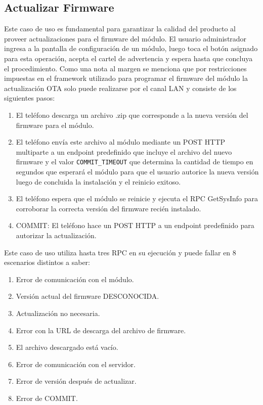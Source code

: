 \subsection{Actualizar Firmware}
Este caso de uso es fundamental para garantizar la calidad del producto al proveer actualizaciones para el firmware del módulo.
El usuario administrador ingresa a la pantalla de configuración de un módulo, luego toca el botón asignado para esta operación, acepta el cartel de advertencia y espera hasta que concluya el procedimiento.
Como una nota al margen se menciona que por restricciones impuestas en el framework utilizado para programar el firmware del módulo la actualización OTA solo puede realizarse por el canal LAN y consiste de los siguientes pasos:
\begin{enumerate}
	\item El teléfono descarga un archivo .zip que corresponde a la nueva versión del firmware para el módulo.
	\item El teléfono envía este archivo al módulo mediante un POST HTTP multiparte a un endpoint predefinido que incluye el archivo del nuevo firmware y el valor \texttt{COMMIT\_TIMEOUT} que determina la cantidad de tiempo en segundos que esperará el módulo para que el usuario autorice la nueva versión luego de concluida la instalación y el reinicio exitoso.
	\item El teléfono espera que el módulo se reinicie y ejecuta el RPC GetSysInfo para corroborar la correcta versión del firmware recién instalado.
	\item COMMIT: El teléfono hace un POST HTTP a un endpoint predefinido para autorizar la actualización.
\end{enumerate} 

Este caso de uso utiliza hasta tres RPC en su ejecución y puede fallar en 8 escenarios distintos a saber:

\begin{enumerate}
	\item Error de comunicación con el módulo.
	\item Versión actual del firmware DESCONOCIDA.
	\item Actualización no necesaria.
	\item Error con la URL de descarga del archivo de firmware.
	\item El archivo descargado está vacío.
	\item Error de comunicación con el servidor.
	\item Error de versión después de actualizar.
	\item Error de COMMIT.
\end{enumerate} 

